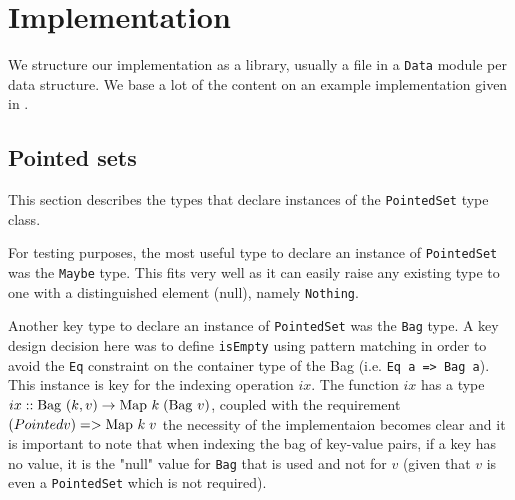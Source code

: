 \section{Implementation}
We structure our implementation as a library, usually a file in a \texttt{Data}
module per data structure. We base a lot of the content on an example
implementation given in
\cite{RelationalAlgebraByWayOfAdjunctionsPrototypeImplementation}.

\subsection{Pointed sets}
This section describes the types that declare instances of the
\texttt{PointedSet} type class.

For testing purposes, the most useful type to declare an instance of
\texttt{PointedSet} was the \texttt{Maybe} type. This fits very well as it can
easily raise any existing type to one with a distinguished element (null),
namely \texttt{Nothing}.

Another key type to declare an instance of \texttt{PointedSet} was the
\texttt{Bag} type. A key design decision here was to define \texttt{isEmpty}
using pattern matching in order to avoid the \texttt{Eq} constraint on the
container type of the Bag (i.e. \texttt{Eq a => Bag a}). This instance is key
for the indexing operation $ix$. The function $ix$ has a type $ix ::
\mathrm{Bag}\ (k, v) \to \mathrm{Map}\ k\;(\mathrm{Bag}\ v)$, coupled with the requirement $(Pointed v)
=> \mathrm{Map}\ k\;v$ the necessity of the implementaion becomes clear and it is
important to note that when indexing the bag of key-value pairs, if a key has no
value, it is the "null" value for \texttt{Bag} that is used and not for $v$
(given that $v$ is even a \texttt{PointedSet} which is not required).
